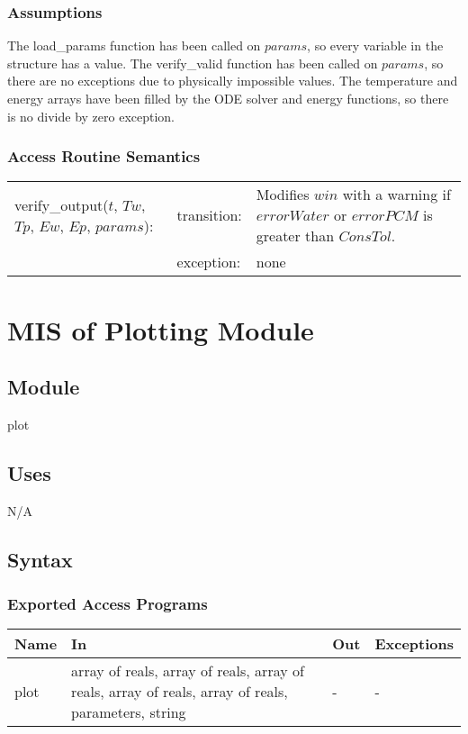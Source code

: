 \documentclass[12pt]{article}
\begin{document}
\subsubsection{Assumptions}
The load\_params function has been called on $params$, so every variable in the structure has a value. The verify\_valid function has been called on $params$, so there are no exceptions due to physically impossible values. The temperature and energy arrays have been filled by the ODE solver and energy functions, so there is no divide by zero exception.
\subsubsection{Access Routine Semantics}
\begin{center}
\begin{tabular}{l l p{6cm}}
verify\_output($t$, $Tw$, $Tp$, $Ew$, $Ep$, $params$): & transition: & Modifies $win$ with a warning if $errorWater$ or $errorPCM$ is greater than $ConsTol$. \\
& exception: & none \\
\end{tabular}
\end{center}

\section{MIS of Plotting Module} \label{Plot}
\subsection{Module}
plot
\subsection{Uses}
N/A
\subsection{Syntax}
\subsubsection{Exported Access Programs}
\begin{center}
\begin{tabular}{p{2cm} p{8cm} p{2cm} p{2cm}}
\hline
\textbf{Name} & \textbf{In} & \textbf{Out} & \textbf{Exceptions} \\
\hline
plot & array of reals, array of reals, array of reals, array of reals, array of reals, parameters, string & - & - \\
\hline
\end{tabular}
\end{center}
\end{document}
